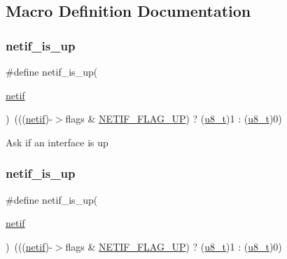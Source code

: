 \subsection{Macro Definition Documentation}
\mbox{\label{group__netif_ga94a4c24c988afc0a577387730f303b19}} 
\subsubsection{\texorpdfstring{netif\+\_\+is\+\_\+up}{netif\_is\_up}\hspace{0.1cm}{\footnotesize\ttfamily [1/2]}}
{\footnotesize\ttfamily \#define netif\+\_\+is\+\_\+up(\begin{DoxyParamCaption}\item[{}]{\hyperlink{structnetif}{netif} }\end{DoxyParamCaption})~(((\hyperlink{structnetif}{netif})-\/$>$flags \& \hyperlink{group__netif__flags_gab47d7d130693dc155f480a5bf447725e}{N\+E\+T\+I\+F\+\_\+\+F\+L\+A\+G\+\_\+\+UP}) ? (\hyperlink{group__compiler__abstraction_ga4caecabca98b43919dd11be1c0d4cd8e}{u8\+\_\+t})1 \+: (\hyperlink{group__compiler__abstraction_ga4caecabca98b43919dd11be1c0d4cd8e}{u8\+\_\+t})0)}

Ask if an interface is up \mbox{\label{group__netif_ga94a4c24c988afc0a577387730f303b19}} 
\subsubsection{\texorpdfstring{netif\+\_\+is\+\_\+up}{netif\_is\_up}\hspace{0.1cm}{\footnotesize\ttfamily [2/2]}}
{\footnotesize\ttfamily \#define netif\+\_\+is\+\_\+up(\begin{DoxyParamCaption}\item[{}]{\hyperlink{structnetif}{netif} }\end{DoxyParamCaption})~(((\hyperlink{structnetif}{netif})-\/$>$flags \& \hyperlink{group__netif__flags_gab47d7d130693dc155f480a5bf447725e}{N\+E\+T\+I\+F\+\_\+\+F\+L\+A\+G\+\_\+\+UP}) ? (\hyperlink{group__compiler__abstraction_ga4caecabca98b43919dd11be1c0d4cd8e}{u8\+\_\+t})1 \+: (\hyperlink{group__compiler__abstraction_ga4caecabca98b43919dd11be1c0d4cd8e}{u8\+\_\+t})0)}

